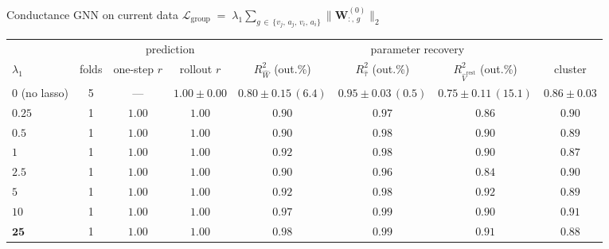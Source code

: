 \documentclass[aspectratio=169]{beamer}
\newcommand{\good}[1]{\textcolor{goodgreen}{#1}}
\begin{document}
\begin{frame}{Conductance GNN on current data}
\label{sl:lasso}
\vspace{0.1cm}
{\centering\scriptsize
$\mathcal{L}_{\mathrm{group}} \;=\; \lambda_1 \displaystyle\sum_{g\,\in\,\{v_j,\,a_j,\,v_i,\,a_i\}}
 \bigl\lVert \mathbf{W}^{(0)}_{:,\,g} \bigr\rVert_2$
\\[4pt]}
\centering\tiny
\setlength{\tabcolsep}{4pt}
\begin{tabular}{lccccccc}
\toprule
 & & \multicolumn{2}{c}{prediction} & \multicolumn{4}{c}{parameter recovery} \\
\cmidrule(lr){3-4}\cmidrule(lr){5-8}
$\lambda_1$ & folds & one-step $r$ & rollout $r$
  & $R^2_{\hat W}$ (out.\%) & $R^2_{\hat\tau}$ (out.\%) & $R^2_{\hat V^{\mathrm{rest}}}$ (out.\%) & cluster \\
\midrule
$0$ (no lasso) & 5 & --- & \good{$1.00{\pm}0.00$}
  & $0.80{\pm}0.15\,(6.4)$ & \good{$0.95{\pm}0.03\,(0.5)$} & $0.75{\pm}0.11\,(15.1)$ & $0.86{\pm}0.03$ \\
\midrule
$0.25$ & 1 & \good{$1.00$} & \good{$1.00$} & $0.90$ & \good{$0.97$} & $0.86$ & \good{$0.90$} \\
$0.5$  & 1 & \good{$1.00$} & \good{$1.00$} & $0.90$ & \good{$0.98$} & \good{$0.90$} & $0.89$ \\
$1$    & 1 & \good{$1.00$} & \good{$1.00$} & \good{$0.92$} & \good{$0.98$} & $0.90$ & $0.87$ \\
$2.5$  & 1 & \good{$1.00$} & \good{$1.00$} & \good{$0.90$} & \good{$0.96$} & $0.84$ & $0.90$ \\
$5$    & 1 & \good{$1.00$} & \good{$1.00$} & \good{$0.92$} & \good{$0.98$} & \good{$0.92$} & $0.89$ \\
$10$   & 1 & \good{$1.00$} & \good{$1.00$} & \good{$0.97$} & \good{$0.99$} & \good{$0.90$} & \good{$0.91$} \\
$\mathbf{25}$ & 1 & \good{$\mathbf{1.00}$} & \good{$\mathbf{1.00}$}
  & \good{$\mathbf{0.98}$} & \good{$\mathbf{0.99}$} & \good{$\mathbf{0.91}$} & $\mathbf{0.88}$ \\
\bottomrule
\end{tabular}\end{frame}
\end{document}
